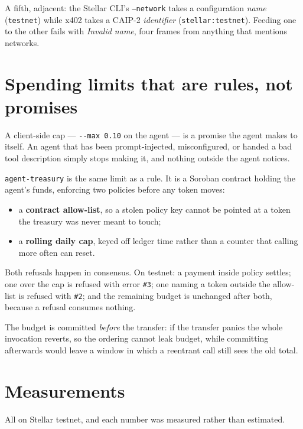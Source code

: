 \documentclass[11pt,a4paper]{article}
\begin{document}
A fifth, adjacent: the Stellar CLI's \texttt{--network} takes a configuration
\emph{name} (\texttt{testnet}) while x402 takes a CAIP-2 \emph{identifier}
(\texttt{stellar:testnet}). Feeding one to the other fails with
\emph{Invalid name}, four frames from anything that mentions networks.

\section{Spending limits that are rules, not promises}

A client-side cap --- \texttt{-{}-max 0.10} on the agent --- is a promise the
agent makes to itself. An agent that has been prompt-injected, misconfigured,
or handed a bad tool description simply stops making it, and nothing outside
the agent notices.

\texttt{agent-treasury} is the same limit as a rule. It is a Soroban contract
holding the agent's funds, enforcing two policies before any token moves:

\begin{itemize}
  \item a \textbf{contract allow-list}, so a stolen policy key cannot be pointed
    at a token the treasury was never meant to touch;
  \item a \textbf{rolling daily cap}, keyed off ledger time rather than a
    counter that calling more often can reset.
\end{itemize}

Both refusals happen in consensus. On testnet: a payment inside policy settles;
one over the cap is refused with error \texttt{\#3}; one naming a token outside
the allow-list is refused with \texttt{\#2}; and the remaining budget is
unchanged after both, because a refusal consumes nothing.

The budget is committed \emph{before} the transfer: if the transfer panics the
whole invocation reverts, so the ordering cannot leak budget, while committing
afterwards would leave a window in which a reentrant call still sees the old
total.

\section{Measurements}

All on Stellar testnet, and each number was measured rather than estimated.
\end{document}
